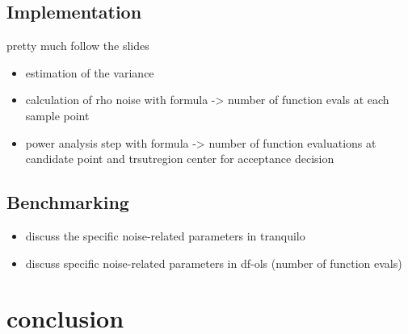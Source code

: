 \subsection{Implementation}
pretty much follow the slides
\begin{itemize}
    \item estimation of the variance
    \item calculation of rho noise with formula -> number of function evals at each sample point
    \item power analysis step with formula -> number of function evaluations at candidate point and trsutregion center for acceptance decision
\end{itemize}
\subsection{Benchmarking}
\begin{itemize}
    \item discuss the specific noise-related parameters in tranquilo
    \item discuss specific noise-related parameters in df-ols (number of function evals)
\end{itemize}

\section{conclusion}
